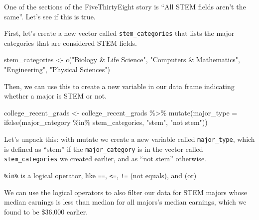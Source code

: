 \documentclass[
]{article}
\newenvironment{Shaded}{\begin{snugshade}}{\end{snugshade}}
\newcommand{\AttributeTok}[1]{\textcolor[rgb]{0.77,0.63,0.00}{#1}}
\newcommand{\FunctionTok}[1]{\textcolor[rgb]{0.00,0.00,0.00}{#1}}
\newcommand{\NormalTok}[1]{#1}
\newcommand{\OtherTok}[1]{\textcolor[rgb]{0.56,0.35,0.01}{#1}}
\newcommand{\SpecialCharTok}[1]{\textcolor[rgb]{0.00,0.00,0.00}{#1}}
\newcommand{\StringTok}[1]{\textcolor[rgb]{0.31,0.60,0.02}{#1}}
\begin{document}
One of the sections of the FiveThirtyEight story is ``All STEM fields
aren't the same''. Let's see if this is true.

First, let's create a new vector called \texttt{stem\_categories} that
lists the major categories that are considered STEM fields.

\begin{Shaded}
\begin{Highlighting}[]
\NormalTok{stem\_categories }\OtherTok{\textless{}{-}} \FunctionTok{c}\NormalTok{(}\StringTok{"Biology \& Life Science"}\NormalTok{,}
                     \StringTok{"Computers \& Mathematics"}\NormalTok{,}
                     \StringTok{"Engineering"}\NormalTok{,}
                     \StringTok{"Physical Sciences"}\NormalTok{)}
\end{Highlighting}
\end{Shaded}

Then, we can use this to create a new variable in our data frame
indicating whether a major is STEM or not.

\begin{Shaded}
\begin{Highlighting}[]
\NormalTok{college\_recent\_grads }\OtherTok{\textless{}{-}}\NormalTok{ college\_recent\_grads }\SpecialCharTok{\%\textgreater{}\%}
  \FunctionTok{mutate}\NormalTok{(}\AttributeTok{major\_type =} \FunctionTok{ifelse}\NormalTok{(major\_category }\SpecialCharTok{\%in\%}\NormalTok{ stem\_categories, }\StringTok{"stem"}\NormalTok{, }\StringTok{"not stem"}\NormalTok{))}
\end{Highlighting}
\end{Shaded}

Let's unpack this: with mutate we create a new variable called
\texttt{major\_type}, which is defined as ``stem'' if the
\texttt{major\_category} is in the vector called
\texttt{stem\_categories} we created earlier, and as ``not stem''
otherwise.

\texttt{\%in\%} is a logical operator, like \texttt{==},
\texttt{\textless{}=}, \texttt{!=} (not equals), and \texttt{\textbar{}}
(or)

We can use the logical operators to also filter our data for STEM majors
whose median earnings is less than median for all majors's median
earnings, which we found to be \$36,000 earlier.
\end{document}
